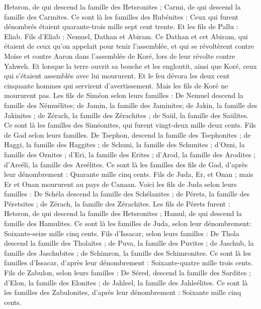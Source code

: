 \begin{multicols}{2}
Hetsron, de qui descend la famille des Hetsronites ; Carmi, de qui descend la famille des Carmites.
Ce sont là les familles des Rubénites : Ceux qui furent dénombrés étaient quarante-trois mille sept cent trente.
Et les fils de Pallu : Eliab.
Fils d'Eliab : Nemuel, Dathan et Abiram. Ce Dathan et cet Abiram, qui étaient de ceux qu’on appelait pour tenir l’assemblée, et qui se révoltèrent contre Moïse et contre Aaron dans l'assemblée de Koré, lors de leur révolte contre Yahweh.
Et lorsque la terre ouvrit sa bouche et les engloutit, ainsi que Koré, ceux qui s'étaient assemblés avec lui moururent. Et le feu dévora les deux cent cinquante hommes qui servirent d'avertissement.
Mais les fils de Koré ne moururent pas.
Les fils de Siméon selon leurs familles : De Nemuel descend la famille des Némuélites; de Jamin, la famille des Jaminites; de Jakin, la famille des Jakinites ;
de Zérach, la famille des Zérachites ; de Saül, la famille des Saülites.
Ce sont là les familles des Siméonites, qui furent vingt-deux mille deux cents.
Fils de Gad selon leurs familles. De Tsephon, descend la famille des Tsephonites ; de Haggi, la famille des Haggites ; de Schuni, la famille des Schunites ;
d'Ozni, la famille des Oznites ; d'Eri, la famille des Erites ;
d'Arod, la famille des Arodites ; d'Areéli, la famille des Areélites.
Ce sont là les familles des fils de Gad, d'après leur dénombrement : Quarante mille cinq cents.
Fils de Juda, Er, et Onan ; mais Er et Onan moururent au pays de Canaan.
Voici les fils de Juda selon leurs familles : De Schéla descend la famille des Schélanites ; de Pérets, la famille des Péretsites ; de Zérach, la famille des Zérachites.
Les fils de Pérets furent : Hetsron, de qui descend la famille des Hetsronites ; Hamul, de qui descend la famille des Hamulites.
Ce sont là les familles de Juda, selon leur dénombrement: Soixante-seize mille cinq cents.
Fils d'Issacar, selon leurs familles : De Thola descend la famille des Tholaïtes ; de Puva, la famille des Puvites ;
de Jaschub, la famille des Jaschubites ; de Schimron, la famille des Schimronites.
Ce sont là les familles d'Issacar, d'après leur dénombrement : Soixante-quatre mille trois cents.
Fils de Zabulon, selon leurs familles : De Séred, descend la famille des Sardites ; d'Elon, la famille des Elonites ; de Jahleel, la famille des Jahleélites.
Ce sont là les familles des Zabulonites, d'après leur dénombrement : Soixante mille cinq cents.

\end{multicols}
